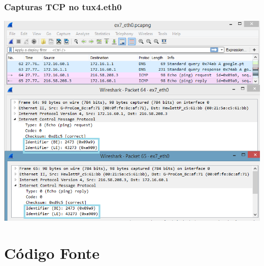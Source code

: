 \documentclass[11pt,a4paper,reqno]{report}
\numberwithin{equation}{section}
\begin{document}
\begin{appendices}
\subsection{Capturas TCP no tux4.eth0}
\label{ex7_ping}
\includegraphics[width=16cm]{ex7_ping.png}

\chapter{Código Fonte}








\end{appendices}
\end{document}
